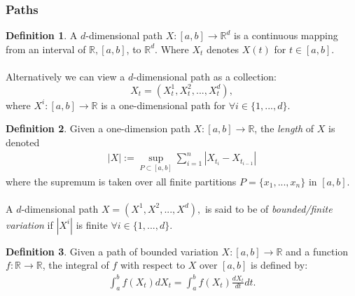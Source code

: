 \documentclass{article}
\theoremstyle{definition}
\newtheorem{definition}{Definition}[section]
\begin{document}
\subsubsection{Paths}
\begin{definition} 
A $d$-dimensional path $X:[a,b] \rightarrow \mathbb{R}^{d}$ is a continuous mapping from an interval of $\mathbb{R}, [a,b]$, to $\mathbb{R}^{d}$. Where $X_{t}$ denotes $X(t)$ for $t \in [a,b]$.\\\\
Alternatively we can view a $d$-dimensional path as a collection: 
$$X_{t} = (X_{t}^1,X_{t}^2,...,X_{t}^d),$$ where $X^i:[a,b] \rightarrow \mathbb{R}$ is a one-dimensional path for $\forall i \in \{1,...,d\}$.
\end{definition}
\begin{definition}
Given a one-dimension path $X:[a,b] \rightarrow \mathbb{R}$, the \textit{length} of $X$ is denoted
\begin{align}
    |X| := \sup_{P\subset [a,b]} \sum_{i=1}^{n} |X_{t_{i}}-X_{t_{i-1}}|
\end{align}
where the supremum is taken over all finite partitions $P = \{x_{1},...,x_{n}\}$ in $[a,b]$. \\\\
A $d$-dimensional path 
$X = (X^1,X^2,...,X^d),$ is said to be of \textit{bounded/finite variation} if $|X^i|$ is finite $\forall i \in \{1,...,d\}$.  
\end{definition}

\begin{definition}
    Given a path of bounded variation $X:[a,b] \rightarrow \mathbb{R}$ and a function $f: \mathbb{R} \rightarrow \mathbb{R}$, the integral of $f$ with respect to $X$ over $[a,b]$ is defined by:
    \begin{align}
      \int_{a}^{b} f(X_{t}) d X_{t} = \int_{a}^{b} f(X_{t}) \frac{d X_{t}}{d t} d t.  
    \end{align}
\end{definition}
\end{document}
